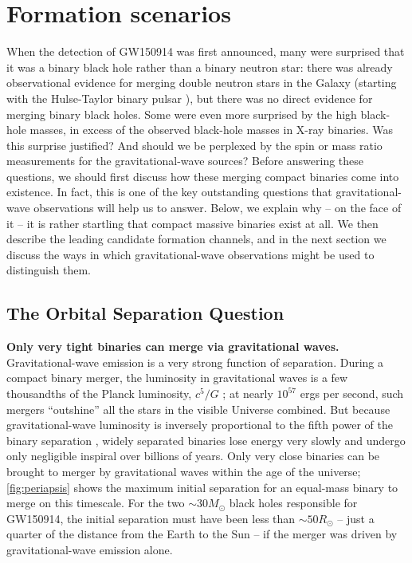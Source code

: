 \documentclass[review]{elsarticle}
\begin{document}
\section{Formation scenarios}\label{form}

When the detection of GW150914 was first announced, many were surprised that it was a binary black hole rather than a binary neutron star: there was already observational evidence for merging double neutron stars in the Galaxy (starting with the Hulse-Taylor binary pulsar \citep{HulseTaylor:1975}), but there was no direct evidence for merging binary black holes. Some were even more surprised by the high black-hole masses, in excess of the observed black-hole masses in X-ray binaries. Was this surprise justified? And should we be perplexed by the spin or mass ratio measurements for the gravitational-wave sources? Before answering these questions, we should first discuss how these merging compact binaries come into existence. In fact, this is one of the key outstanding questions that gravitational-wave observations will help us to answer. Below, we explain why -- on the face of it -- it is rather startling that compact massive binaries exist at all. We then describe the leading candidate formation channels, and in the next section we discuss the ways in which gravitational-wave observations might be used to distinguish them.


\subsection{The Orbital Separation Question}


\textbf{Only very tight binaries can merge via gravitational waves.} Gravitational-wave emission is a very strong function of separation. During a compact binary merger, the luminosity in gravitational waves is a few thousandths of the Planck luminosity, $c^5/G$ \citep[e.g.,][]{Cardoso:2018}; at nearly $10^{57}$ ergs per second, such mergers ``outshine'' all the stars in the visible Universe combined. But because gravitational-wave luminosity is inversely proportional to the fifth power of the binary separation \citep{Peters:1964}, widely separated binaries lose energy very slowly and undergo only negligible inspiral over billions of years. Only very close binaries can be brought to merger by gravitational waves within the age of the universe; \autoref{fig:periapsis} shows the maximum initial separation for an equal-mass binary to merge on this timescale. For the two $\sim 30 M_\odot$ black holes responsible for GW150914, the initial separation must have been less than $\sim 50 R_\odot$ -- just a quarter of the distance from the Earth to the Sun -- if the merger was driven by gravitational-wave emission alone.
\end{document}

